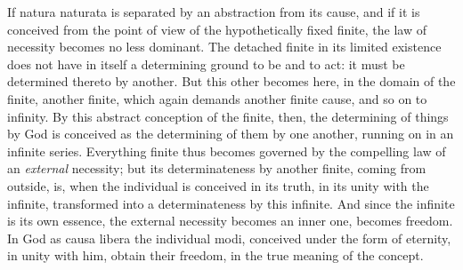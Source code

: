 If natura naturata is separated by an abstraction from its cause, and
if it is conceived from the point of view of the hypothetically fixed
finite, the law of necessity becomes no less dominant. The detached
finite in its limited existence does not have in itself a
determining ground to be and to act: it must be determined thereto by
another. But this other becomes here, in the domain of the finite,
another finite, which again demands another finite cause, and so on
to infinity. By this abstract conception of the finite, then, the
determining of things by God is conceived as the determining of them
by one another, running on in an infinite series. Everything finite
thus becomes governed by the compelling law of an \emph{external}
necessity; but its determinateness by another finite, coming from
outside, is, when the individual is conceived in its truth, in its
unity with the infinite, transformed into a determinateness by this
infinite. And since the infinite is its own essence, the external
necessity becomes an inner one, becomes freedom. In God as causa
libera the individual modi, conceived under the form of eternity, in
unity with him, obtain their freedom, in the true meaning of the
concept.

\divrule

